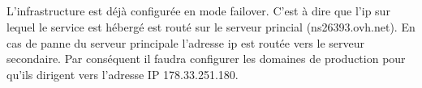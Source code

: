 \subparagraph{}
L'infrastructure est déjà configurée en mode failover. C'est à dire que l'ip sur lequel le service est hébergé est routé sur le
serveur princial (ns26393.ovh.net). En cas de panne du serveur principale l'adresse ip est routée vers le serveur
secondaire. Par conséquent il faudra configurer les domaines de production pour qu'ils dirigent vers l'adresse IP
178.33.251.180.




%
%
%
%
%


